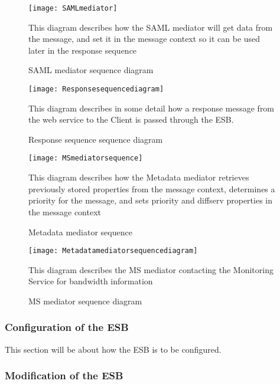         \begin{figure}[h]
            \centering
            \texttt{[image: SAMLmediator]}
            \caption{SAML mediator sequence diagram}
            This diagram describes how the SAML mediator will get data from the message, and set it in the message context so it can be used later in the response sequence
            \label{fig:SAMLmediator}
        \end{figure}
        
        \begin{figure}[h]
            \texttt{[image: Responsesequencediagram]}
            \caption{Response sequence sequence diagram}
            This diagram describes in some detail how a response message from the web service to the Client is passed through the ESB.
            \label{fig:Responsesequencediagram}
        \end{figure}
    
        \begin{figure}[h]
            \centering
            \texttt{[image: MSmediatorsequence]}
            \caption{Metadata mediator sequence}
            This diagram describes how the Metadata mediator retrieves previously stored properties from the message context, determines a priority for the message, and sets priority and diffserv properties in the message context
            \label{fig:MSmediatorsequence}
        \end{figure}
        
        \begin{figure}[h]
            \centering
            \texttt{[image: Metadatamediatorsequencediagram]}
            \caption{MS mediator sequence diagram}
            This diagram describes the MS mediator contacting the Monitoring Service for bandwidth information
            \label{fig:Metadatamediatorsequencediagram}
        \end{figure}

    \subsubsection{Configuration of the ESB}\label{Configuration of the ESB} 
    This section will be about how the ESB is to be configured.

    \subsubsection{Modification of the ESB}\label{Modification of the ESB} 

